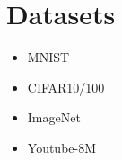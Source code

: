 \chapter{Datasets}
\label{chapter:datasets}

\begin{itemize}
  \item MNIST
  \item CIFAR10/100
  \item ImageNet
  \item Youtube-8M
\end{itemize}

